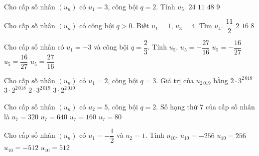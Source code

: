 \begin{ex}%
	Cho cấp số nhân $(u_n)$ có  $u_1=3$, công bội $q=2$. Tính $u_5$.
	 \choice
		 {$24$}
		{$11$} 
		 {\True $48$}
		{$9$} 
\end{ex}

\begin{ex}%
	Cho cấp số nhân $(u_n)$ có công bội $q>0$. Biết  $u_1=1$, $u_3=4$. Tìm $u_4$.
	 \choice
		 {$\dfrac{11}{2}$}
		{$2$} 
		 {$16$}
		 {\True $8$}
\end{ex}

\begin{ex}%
	Cho cấp số nhân có $u_1=-3$ và công bội  $q=\dfrac{2}{3}$. Tính $u_5$.
	 \choice
		{$u_5=-\dfrac{27}{16}$} 
		 {\True $u_5=-\dfrac{16}{27}$}
		{$u_5=\dfrac{16}{27}$} 
		 {$u_5=\dfrac{27}{16}$}
\end{ex}

\begin{ex}%
	Cho cấp số nhân $(u_n)$ có $u_1=2$,  công bội $q=3$. Giá trị của $u_{2\,019}$ bằng
	\choice 
		{\True $2\cdot  3^{2\,018}$}
		 {$3\cdot 2^{2\,018}$}
		{$2\cdot  3^{2\,019}$}
		{$3\cdot  2^{2\,019}$}
\end{ex}

\begin{ex}%
	Cho cấp số nhân $(u_n)$ có $u_2=5$, công bội $q=2$. Số hạng thứ $7$  của cấp số nhân là
	 \choice
		{$u_7=320$} 
		{$u_7=640$} 
		{\True $u_7=160$} 
		 {$u_7=80$}
\end{ex}

\begin{ex}%
	Cho  cấp số nhân $(u_n)$ có $u_1=-\dfrac{1}{2}$ và $u_2=1$. Tính $u_{10}$.
	 \choice
		{$u_{10}=-256$} 
		 {\True $u_{10}=256$}
		{$u_{10}=-512$} 
		 {$u_{10}=512$}
\end{ex}

